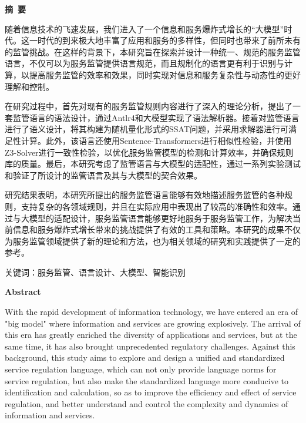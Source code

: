 \cleardoublepage{}
\begin{center}
    \bfseries {} 摘~要
\end{center}

随着信息技术的飞速发展，我们进入了一个信息和服务爆炸式增长的“大模型”时代。这一时代的到来极大地丰富了应用和服务的多样性，但同时也带来了前所未有的监管挑战。在这样的背景下，本研究旨在探索并设计一种统一、规范的服务监管语言，不仅可以为服务监管提供语言规范，而且规制化的语言更有利于识别与计算，以提高服务监管的效率和效果，同时实现对信息和服务复杂性与动态性的更好理解和控制。

在研究过程中，首先对现有的服务监管规则内容进行了深入的理论分析，提出了一套监管语言的语法设计，通过Antlr4和大模型实现了语法解析器。接着对监管语言进行了语义设计，将其构建为随机量化形式的SSAT问题，并采用求解器进行可满足性计算。此外，该语言还使用Sentence-Transformers进行相似性检验，并使用Z3-Solver进行一致性检验，以优化服务监管模型的检测和计算效率，并确保规则库的质量。最后，本研究考虑了监管语言与大模型的适配性，通过一系列实验测试和验证了所设计的监管语言及其与大模型的契合效果。

研究结果表明，本研究所提出的服务监管语言能够有效地描述服务监管的各种规则，支持复杂的各领域规则，并且在实际应用中表现出了较高的准确性和效率。通过与大模型的适配设计，服务监管语言能够更好地服务于服务监管工作，为解决当前信息和服务爆炸式增长带来的挑战提供了有效的工具和策略。本研究的成果不仅为服务监管领域提供了新的理论和方法，也为相关领域的研究和实践提供了一定的参考。

\vspace{1\baselineskip}
\noindent 关键词：服务监管、语言设计、大模型、智能识别

\cleardoublepage{}
\begin{center}
    \bfseries {} Abstract
\end{center}

With the rapid development of information technology, we have entered an era of "big model" where information and services are growing explosively. The arrival of this era has greatly enriched the diversity of applications and services, but at the same time, it has also brought unprecedented regulatory challenges. Against this background, this study aims to explore and design a unified and standardized service regulation language, which can not only provide language norms for service regulation, but also make the standardized language more conducive to identification and calculation, so as to improve the efficiency and effect of service regulation, and better understand and control the complexity and dynamics of information and services.

